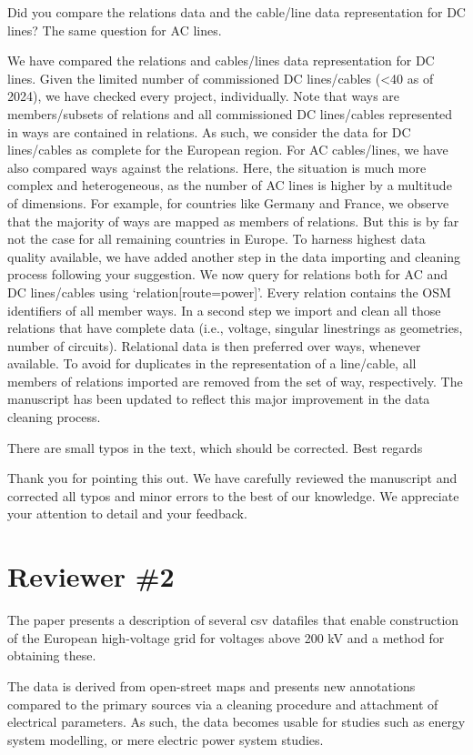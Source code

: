 \documentclass{response}
\begin{document}
\RC Did you compare the relations data and the cable/line data representation for DC lines? The same question for AC lines.

\AR We have compared the relations and cables/lines data representation for DC lines. Given the limited number of commissioned DC lines/cables (<40 as of 2024), we have checked every project, individually. Note that ways are members/subsets of relations and all commissioned DC lines/cables represented in ways are contained in relations. As such, we consider the data for DC lines/cables as complete for the European region. For AC cables/lines, we have also compared ways against the relations. Here, the situation is much more complex and heterogeneous, as the number of AC lines is higher by a multitude of dimensions. For example, for countries like Germany and France, we observe that the majority of ways are mapped as members of relations. But this is by far not the case for all remaining countries in Europe. To harness highest data quality available, we have added another step in the data importing and cleaning process following your suggestion. We now query for relations both for AC and DC lines/cables using `relation[route=power]'. Every relation contains the OSM identifiers of all member ways. In a second step we import and clean all those relations that have complete data (i.e., voltage, singular linestrings as geometries, number of circuits). Relational data is then preferred over ways, whenever available. To avoid for duplicates in the representation of a line/cable, all members of relations imported are removed from the set of way, respectively. The manuscript has been updated to reflect this major improvement in the data cleaning process.

\RC There are small typos in the text, which should be corrected. Best regards

\AR Thank you for pointing this out. We have carefully reviewed the manuscript and corrected all typos and minor errors to the best of our knowledge. We appreciate your attention to detail and your feedback.

\section*{Reviewer \#2}

\RC The paper presents a description of several csv datafiles that enable construction of the European high-voltage grid for voltages above 200 kV and a method for obtaining these.

\RC The data is derived from open-street maps and presents new annotations compared to the primary sources via a cleaning procedure and attachment of electrical parameters. As such, the data becomes usable for studies such as energy system modelling, or mere electric power system studies.
\end{document}
